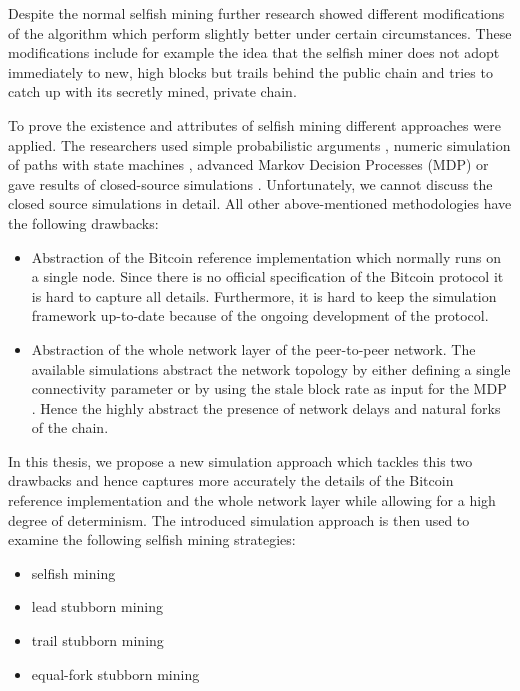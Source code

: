 Despite the normal selfish mining further research \cite{nayak2016stubborn,sapirshtein2016optimal, gervais2015tampering, gervais2016security, bahack2013theoretical} showed different modifications of the algorithm which perform slightly better under certain circumstances.
These modifications include for example the idea that the selfish miner does not adopt immediately to new, high blocks but trails behind the public chain and tries to catch up with its secretly mined, private chain.

To prove the existence and attributes of selfish mining different approaches were applied.
The researchers used simple probabilistic arguments \cite{eyal2014majority, bahack2013theoretical}, numeric simulation of paths with state machines \cite{gervais2015tampering, nayak2016stubborn}, advanced Markov Decision Processes (MDP) \cite{sapirshtein2016optimal, gervais2016security} or gave results of closed-source simulations \cite{eyal2014majority, sapirshtein2016optimal}.
Unfortunately, we cannot discuss the closed source simulations in detail.
All other above-mentioned methodologies have the following drawbacks:
\begin{itemize}
\item Abstraction of the Bitcoin reference implementation which normally runs on a single node.
Since there is no official specification of the Bitcoin protocol it is hard to capture all details.
Furthermore, it is hard to keep the simulation framework up-to-date because of the ongoing development of the protocol.
\item Abstraction of the whole network layer of the peer-to-peer network.
The available simulations abstract the network topology by either defining a single connectivity parameter \cite{eyal2014majority, bahack2013theoretical, nayak2016stubborn, sapirshtein2016optimal, gervais2015tampering} or by using the stale block rate as input for the MDP \cite{gervais2016security}.
Hence the highly abstract the presence of network delays and natural forks of the chain.
\end{itemize}

In this thesis, we propose a new simulation approach which tackles this two drawbacks and hence captures more accurately the details of the Bitcoin reference implementation and the whole network layer while allowing for a high degree of determinism.
The introduced simulation approach is then used to examine the following selfish mining strategies:

\begin{itemize}
\item selfish mining \cite{eyal2014majority}
\item lead stubborn mining \cite{nayak2016stubborn}
\item trail stubborn mining \cite{nayak2016stubborn}
\item equal-fork stubborn mining \cite{nayak2016stubborn}
\end{itemize}


